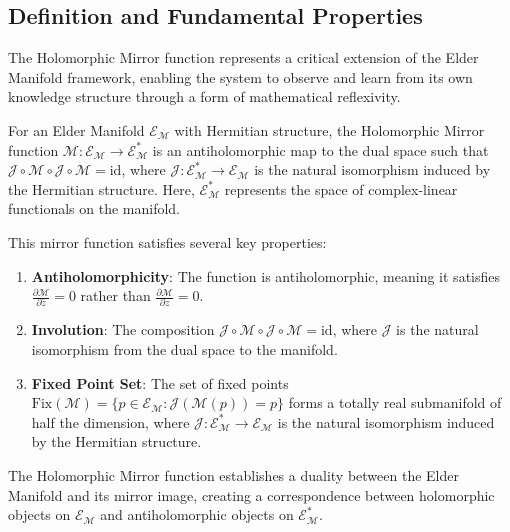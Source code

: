\subsection{Definition and Fundamental Properties}

The Holomorphic Mirror function represents a critical extension of the Elder Manifold framework, enabling the system to observe and learn from its own knowledge structure through a form of mathematical reflexivity.

\begin{definition}
For an Elder Manifold $\mathcal{E}_{\mathcal{M}}$ with Hermitian structure, the Holomorphic Mirror function $\mathcal{M}: \mathcal{E}_{\mathcal{M}} \rightarrow \mathcal{E}_{\mathcal{M}}^*$ is an antiholomorphic map to the dual space such that $\mathcal{J} \circ \mathcal{M} \circ \mathcal{J} \circ \mathcal{M} = \text{id}$, where $\mathcal{J}: \mathcal{E}_{\mathcal{M}}^* \rightarrow \mathcal{E}_{\mathcal{M}}$ is the natural isomorphism induced by the Hermitian structure. Here, $\mathcal{E}_{\mathcal{M}}^*$ represents the space of complex-linear functionals on the manifold.
\end{definition}

This mirror function satisfies several key properties:

\begin{enumerate}
\item \textbf{Antiholomorphicity}: The function is antiholomorphic, meaning it satisfies $\frac{\partial \mathcal{M}}{\partial \overline{z}} = 0$ rather than $\frac{\partial \mathcal{M}}{\partial z} = 0$.
\item \textbf{Involution}: The composition $\mathcal{J} \circ \mathcal{M} \circ \mathcal{J} \circ \mathcal{M} = \text{id}$, where $\mathcal{J}$ is the natural isomorphism from the dual space to the manifold.
\item \textbf{Fixed Point Set}: The set of fixed points $\text{Fix}(\mathcal{M}) = \{p \in \mathcal{E}_{\mathcal{M}} : \mathcal{J}(\mathcal{M}(p)) = p\}$ forms a totally real submanifold of half the dimension, where $\mathcal{J}: \mathcal{E}_{\mathcal{M}}^* \rightarrow \mathcal{E}_{\mathcal{M}}$ is the natural isomorphism induced by the Hermitian structure.
\end{enumerate}

\begin{theorem}
The Holomorphic Mirror function establishes a duality between the Elder Manifold and its mirror image, creating a correspondence between holomorphic objects on $\mathcal{E}_{\mathcal{M}}$ and antiholomorphic objects on $\mathcal{E}_{\mathcal{M}}^*$.
\end{theorem}

